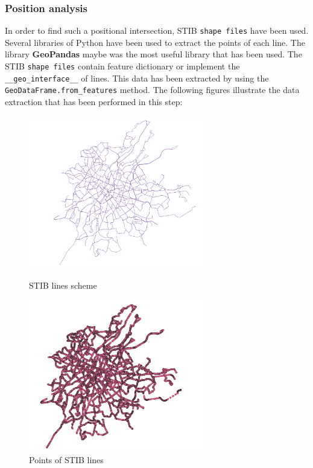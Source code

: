 \documentclass{article}
\begin{document}
\subsubsection{Position analysis}
In order to find such a positional intersection, STIB \texttt{shape files} have been used. Several libraries of Python have been used to extract the points of each line. The library \textbf{GeoPandas} maybe was the most useful library that has been used. The STIB \texttt{shape files} contain feature dictionary or implement the \texttt{\_\_geo\_interface\_\_} of lines. This data has been extracted by using the \texttt{GeoDataFrame.from\_features} method. The following figures illustrate the data extraction that has been performed in this step:
\newline
\begin{figure}[htbp]
  \begin{minipage}[hb]{7cm}
    \centering
    \includegraphics[width=\textwidth, height=6.65cm]{images/lines.png}
    \caption{STIB lines scheme}
  \end{minipage}
  \hspace{2cm}
  \begin{minipage}[hb]{7cm}
    \centering
    \includegraphics[width=\textwidth, height=6.65cm]{images/linesPoints.png}
    \caption{Points of STIB lines}
  \end{minipage}
\end{figure}
\end{document}
